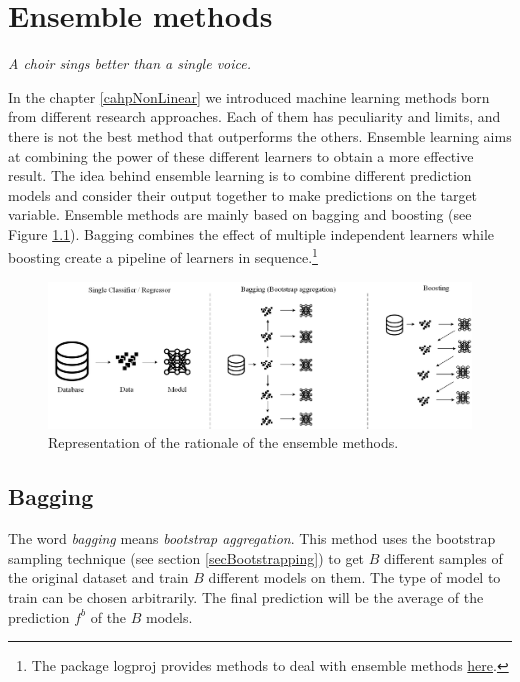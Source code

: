 \chapter{Ensemble methods} \label{cahpEnsemble}

\epigraph{\textit{A choir sings better than a single voice.}}{}


In the chapter \ref{cahpNonLinear} we introduced machine learning methods born from different research approaches. Each of them has peculiarity and limits, and there is not the best method that outperforms the others. Ensemble learning aims at combining the power of these different learners to obtain a more effective result. The idea behind ensemble learning is to combine different prediction models and consider their output together to make predictions on the target variable. Ensemble methods are mainly based on bagging and boosting (see Figure \ref{fig_ensemble}). Bagging combines the effect of multiple independent learners while boosting create a pipeline of learners in sequence.\footnote{The package logproj provides methods to deal with ensemble methods \href{https://github.com/aletuf93/logproj/blob/master/logproj/M_learningMethod/ensemble_methods.py}{here}.}

\begin{figure}[hbt!]
\centering
\includegraphics[width=1\textwidth]{SectionLetsMath/ensembleMethods_fig/fig_ensemble.png}
\captionsetup{type=figure}
\caption{Representation of the rationale of the ensemble methods.}
\label{fig_ensemble}
\end{figure}

\section{Bagging}
The word \textit{bagging} means \textit{bootstrap aggregation}. This method uses the bootstrap sampling technique (see section \ref{secBootstrapping}) to get $B$ different samples of the original dataset and train $B$ different models on them. The type of model to train can be chosen arbitrarily. The final prediction will be the average of the prediction $f^b$ of the $B$ models.


